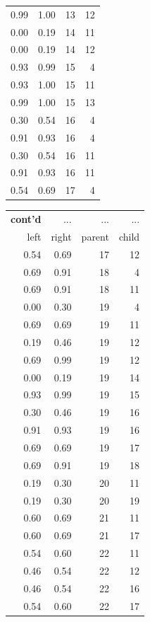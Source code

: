 \documentclass[fontscale=0.38,a0paper]{baposter}
\begin{document}
\begin{poster}
{\begin{tabular}{|rrrr|}
  0.99 & 1.00 &  13 &  12 \\ 
  0.00 & 0.19 &  14 &  11 \\ 
  0.00 & 0.19 &  14 &  12 \\ 
  0.93 & 0.99 &  15 &   4 \\ 
  0.93 & 1.00 &  15 &  11 \\ 
  0.99 & 1.00 &  15 &  13 \\ 
  0.30 & 0.54 &  16 &   4 \\ 
  0.91 & 0.93 &  16 &   4 \\ 
  0.30 & 0.54 &  16 &  11 \\ 
  0.91 & 0.93 &  16 &  11 \\ 
  0.54 & 0.69 &  17 &   4 \\ 
   \hline
\end{tabular}
\begin{tabular}{|rrrr|}
  \hline
    \textbf{cont'd} & ... &  ... & ... \\
left & right & parent & child \\ 
  \hline
  0.54 & 0.69 &  17 &  12 \\ 
  0.69 & 0.91 &  18 &   4 \\ 
  0.69 & 0.91 &  18 &  11 \\ 
  0.00 & 0.30 &  19 &   4 \\ 
  0.69 & 0.69 &  19 &  11 \\ 
  0.19 & 0.46 &  19 &  12 \\ 
  0.69 & 0.99 &  19 &  12 \\ 
  0.00 & 0.19 &  19 &  14 \\ 
  0.93 & 0.99 &  19 &  15 \\ 
  0.30 & 0.46 &  19 &  16 \\ 
  0.91 & 0.93 &  19 &  16 \\ 
  0.69 & 0.69 &  19 &  17 \\ 
  0.69 & 0.91 &  19 &  18 \\ 
  0.19 & 0.30 &  20 &  11 \\ 
  0.19 & 0.30 &  20 &  19 \\ 
  0.60 & 0.69 &  21 &  11 \\ 
  0.60 & 0.69 &  21 &  17 \\ 
  0.54 & 0.60 &  22 &  11 \\ 
  0.46 & 0.54 &  22 &  12 \\ 
  0.46 & 0.54 &  22 &  16 \\ 
  0.54 & 0.60 &  22 &  17 \\ 
   \hline
\end{tabular}

}
\end{poster}
\end{document}

